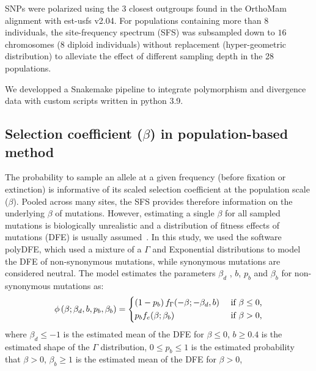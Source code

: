 \documentclass{article}
\newcommand{\Spop}{\beta}
\begin{document}
    SNPs were polarized using the $3$ closest outgroups found in the OrthoMam alignment with est-usfs v2.04\cite{keightley_inferring_2018}.
    For populations containing more than $8$ individuals, the site-frequency spectrum (SFS) was subsampled down to $16$ chromosomes ($8$ diploid individuals) without replacement (hyper-geometric distribution) to alleviate the effect of different sampling depth in the 28 populations.

    We developped a Snakemake pipeline to integrate polymorphism and divergence data with custom scripts written in python 3.9.

    \subsection{Selection coefficient ($\Spop$) in population-based method}
    \label{subsec:s-polymorphism-method}
    The probability to sample an allele at a given frequency (before fixation or extinction) is informative of its scaled selection coefficient at the population scale ($\Spop$).
    Pooled across many sites, the SFS provides therefore information on the underlying $\Spop$ of mutations.
    However, estimating a single $\Spop$ for all sampled mutations is biologically unrealistic and a distribution of fitness effects of mutations (DFE) is usually assumed~\cite{eyre-walker_distribution_2006, eyre-walker_estimating_2009}.
    In this study, we used the software polyDFE\cite{tataru_inference_2017, tataru_polydfe_2020}, which used a mixture of a $\Gamma$ and Exponential distributions to model the DFE of non-synonymous mutations, while synonymous mutations are considered neutral.
    The model estimates the parameters $\Spop_d$ , $b$, $p_b$ and $\Spop_b$ for non-synonymous mutations as:
    \begin{equation}
        \phi \left( \Spop; \Spop_d , b, p_b, \Spop_b \right) =
        \begin{dcases}
            \left( 1 - p_b \right) f_{\Gamma}(-\Spop; -\Spop_d, b) & \text{ if $\Spop \leq 0$,} \\
            p_b f_{e}(\Spop; \Spop_b) & \text{ if $\Spop > 0$,} \\
        \end{dcases}
    \end{equation}
    where $\Spop_d \leq -1 $ is the estimated mean of the DFE for $\Spop \leq 0$,
    $b \geq 0.4$ is the estimated shape of the $\Gamma$ distribution,
    $0 \leq p_b \leq 1$ is the estimated probability that $\Spop > 0$,
    $\Spop_b \geq 1$ is the estimated mean of the DFE for $\Spop > 0$,
\end{document}
